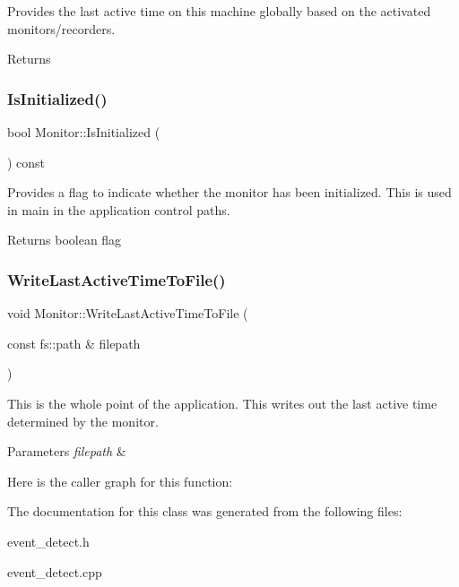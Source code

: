Provides the last active time on this machine globally based on the activated monitors/recorders. 

\begin{DoxyReturn}{Returns}

\end{DoxyReturn}
\mbox{\label{classEventDetect_1_1Monitor_a8d0a2609e4c8613bc020e239d280dfb5}} 
\subsubsection{\texorpdfstring{Is\+Initialized()}{IsInitialized()}}
{\footnotesize\ttfamily bool Monitor\+::\+Is\+Initialized (\begin{DoxyParamCaption}{ }\end{DoxyParamCaption}) const}



Provides a flag to indicate whether the monitor has been initialized. This is used in main in the application control paths. 

\begin{DoxyReturn}{Returns}
boolean flag 
\end{DoxyReturn}
\mbox{\label{classEventDetect_1_1Monitor_af1175eb0bedd877b861bfd76451e8711}} 
\subsubsection{\texorpdfstring{Write\+Last\+Active\+Time\+To\+File()}{WriteLastActiveTimeToFile()}}
{\footnotesize\ttfamily void Monitor\+::\+Write\+Last\+Active\+Time\+To\+File (\begin{DoxyParamCaption}\item[{const fs\+::path \&}]{filepath }\end{DoxyParamCaption})\hspace{0.3cm}{\ttfamily [private]}}



This is the whole point of the application. This writes out the last active time determined by the monitor. 


\begin{DoxyParams}{Parameters}
{\em filepath} & \\
\hline
\end{DoxyParams}
Here is the caller graph for this function\+:


The documentation for this class was generated from the following files\+:\begin{DoxyCompactItemize}
\item 
event\+\_\+detect.\+h\item 
event\+\_\+detect.\+cpp\end{DoxyCompactItemize}
